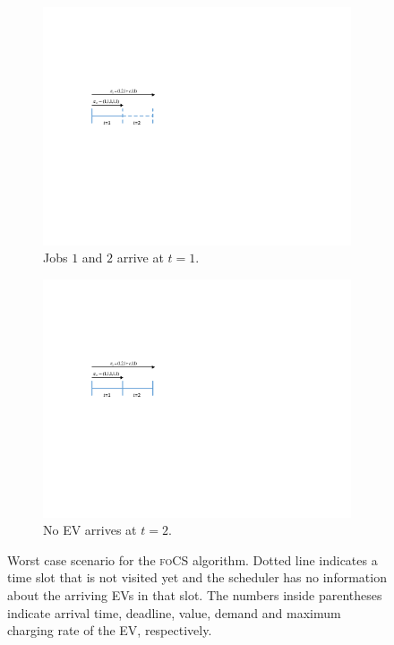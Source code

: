 \documentclass[11pt]{article}
\newcommand{\focs}{\textsc{foCS}\xspace}
\begin{document}
\begin{figure}[t]
	\center
	\begin{subfigure}[b]{.33\textwidth}%
		\includegraphics[width=\textwidth]{Ex2a.pdf}
		\caption{Jobs $1$ and $2$ arrive at $t=1$.}%
		\label{fig:Ex2a}%
	\end{subfigure}
	\hspace{8mm}
	\begin{subfigure}[b]{.33\textwidth}%
		\includegraphics[width=\textwidth]{Ex2b.pdf}
		\caption{No EV arrives at $t=2$.}%
		\label{fig:Ex2b}
	\end{subfigure}		
	\caption{Worst case scenario for the \focs algorithm. Dotted line indicates a time slot that is not visited yet and the scheduler has no information about the arriving EVs in that slot. The numbers inside parentheses indicate arrival time, deadline, value, demand and maximum charging rate of the EV, respectively.}
	\label{fig:Ex2}
\end{figure}
\end{document}
